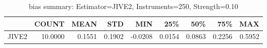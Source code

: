 \begin{table}[ht]
\centering
\caption{bias summary: Estimator=JIVE2, Instruments=250, Strength=0.10}
\begin{tabular}{lrrrrrrrr}
\toprule
 & COUNT & MEAN & STD & MIN & 25\% & 50\% & 75\% & MAX \\
\midrule
JIVE2 & 10.0000 & 0.1551 & 0.1902 & -0.0208 & 0.0154 & 0.0863 & 0.2256 & 0.5952 \\
\bottomrule
\end{tabular}
\end{table}
